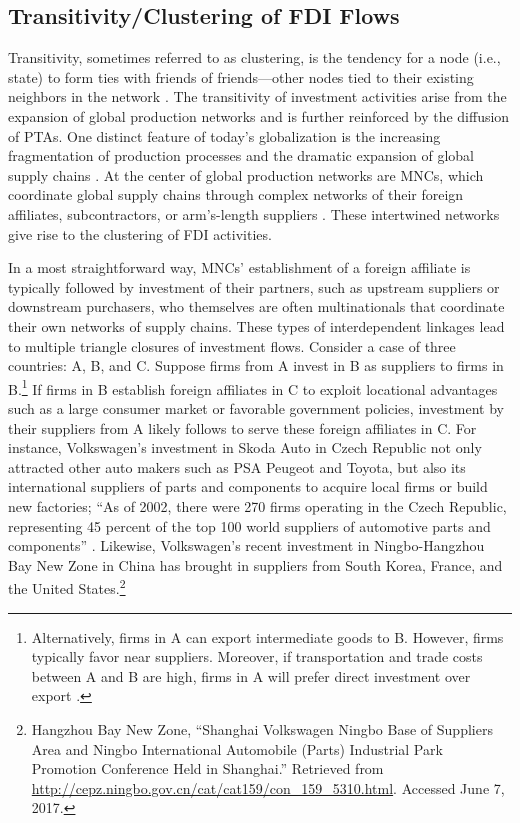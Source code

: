 \documentclass[reqno,onecolumn,letterpaper,12pt]{article}
\begin{document}
\subsection{Transitivity/Clustering of FDI Flows}
Transitivity, sometimes referred to as clustering, is the tendency for a node (i.e., state) to form ties with friends of friends---other nodes tied to their existing neighbors in the network \citep{holland1971transitivity}. The transitivity of investment activities arise from the expansion of global production networks and is further reinforced by the diffusion of PTAs. One distinct feature of today's globalization is the increasing fragmentation of production processes and the dramatic expansion of global supply chains \citep{UNCTAD:2013}. At the center of global production networks are MNCs, which coordinate global supply chains through complex networks of their foreign affiliates, subcontractors, or arm's-length suppliers \citep[xxii]{UNCTAD:2013}. These intertwined networks give rise to the clustering of FDI activities.

In a most straightforward way, MNCs' establishment of a foreign affiliate is typically followed by investment of their partners, such as upstream suppliers or downstream purchasers, who themselves are often multinationals that coordinate their own networks of supply chains. These types of interdependent linkages lead to multiple triangle closures of investment flows. Consider a case of three countries: A, B, and C. Suppose firms from A invest in B as suppliers to firms in B.\footnote{Alternatively, firms in A can export intermediate goods to B. However, firms typically favor near suppliers. Moreover, if transportation and trade costs between A and B are high, firms in A will prefer direct investment over export \citep{Carr_et_al:2001}. } If firms in B establish foreign affiliates in C to exploit locational advantages such as a large consumer market or favorable government policies, investment by their suppliers from A likely follows to serve these foreign affiliates in C. For instance, Volkswagen's investment in Skoda Auto in Czech Republic not only attracted other auto makers such as PSA Peugeot and Toyota, but also its international suppliers of parts and components to acquire local firms or build new factories; ``As of 2002, there were 270 firms operating in the Czech Republic, representing 45 percent of the top 100 world suppliers of automotive parts and components'' \citep[352]{Kaminski_Javorcik:2005}. Likewise, Volkswagen's recent investment in Ningbo-Hangzhou Bay New Zone in China has brought in suppliers from South Korea, France, and the United States.\footnote{Hangzhou Bay New Zone, ``Shanghai Volkswagen Ningbo Base of Suppliers Area and Ningbo International Automobile (Parts) Industrial Park Promotion Conference Held in Shanghai.'' Retrieved from \url{http://cepz.ningbo.gov.cn/cat/cat159/con_159_5310.html}. Accessed June 7, 2017.}
\end{document}
